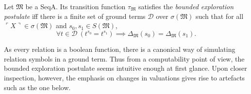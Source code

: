 \documentclass[12pt]{article}
\numberwithin{equation}{section}
\begin{document}
\begin{defi}\label{def217}
Let $\mathfrak{M}$ be a SeqA. Its transition function $\tau_{\mathfrak{M}}$ satisfies the \emph{bounded exploration postulate} iff there is a finite set of ground terms $\mathcal{D}$ over $\sigma(\mathfrak{M})$ such that for all $\ulcorner X \urcorner \in \sigma(\mathfrak{M})$ and $s_0, s_1 \in S(\mathfrak{M})$,
\begin{equation*}
    \forall t \in \mathcal{D} \ (t^{s_0} = t^{s_1}) \implies \Delta_{\mathfrak{M}}(s_0) = \Delta_{\mathfrak{M}}(s_1) \text{.}
\end{equation*}
\end{defi}

As every relation is a boolean function, there is a canonical way of simulating relation symbols in a ground term. Thus from a computability point of view, the bounded exploration postulate seems intuitive enough at first glance. Upon closer inspection, however, the emphasis on changes in valuations gives rise to artefacts such as the one below.
\end{document}
